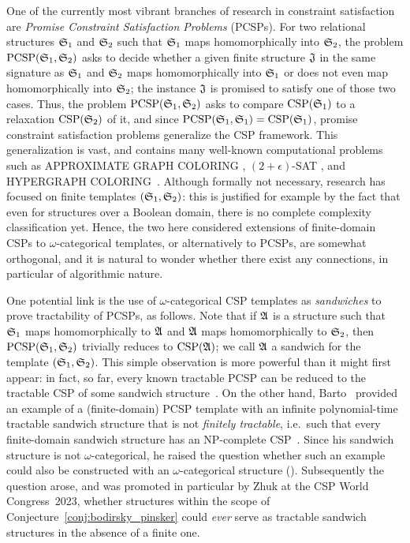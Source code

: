  One of the currently most vibrant branches of research in constraint satisfaction are \emph{Promise Constraint Satisfaction Problems} (PCSPs).
%
For two relational structures $\mathfrak{S}_1$ and $\mathfrak{S}_2$ such that $\mathfrak{S}_1$ maps homomorphically into $\mathfrak{S}_2$, the problem  $\mathrm{PCSP}(\mathfrak{S}_1,\mathfrak{S}_2)$ asks to decide whether a given finite  structure $\mathfrak{J}$ in the same signature as $\mathfrak{S}_1$ and $\mathfrak{S}_2$ maps homomorphically into $\mathfrak{S}_1$ or does not even map homomorphically into $\mathfrak{S}_2$; the instance $\mathfrak{J}$ is  promised to satisfy one of those two cases. Thus, the problem $\mathrm{PCSP}(\mathfrak{S}_1,\mathfrak{S}_2)$ asks to compare $\mathrm{CSP}(\mathfrak{S}_1)$ to a relaxation $\mathrm{CSP}(\mathfrak{S}_2)$ of it, and  
since $\mathrm{PCSP}(\mathfrak{S}_1,\mathfrak{S}_1)=\mathrm{CSP}(\mathfrak{S}_1)$, promise constraint satisfaction problems generalize the CSP framework. This generalization is vast, and contains many well-known computational problems such as  APPROXIMATE GRAPH COLORING \cite{approximatecolouring}, $(2+\epsilon)$-SAT \cite{2plusepsilonSAT}, and HYPERGRAPH COLORING~\cite{hypergraphcol}. 
%
%
Although formally not necessary,  research has focused on finite templates $(\mathfrak{S}_1,\mathfrak{S}_2)$: this is justified for example by the fact that even for structures over a Boolean domain, there is no complete complexity classification yet. 
%
Hence, the two here considered extensions of finite-domain CSPs to $\omega$-categorical templates, or alternatively to PCSPs, are somewhat orthogonal, and it is natural to wonder whether there exist any connections, in particular of algorithmic nature. 




 One potential link is the use of $\omega$-categorical CSP templates as \emph{sandwiches} to prove tractability of PCSPs, as follows. 
Note that if $\mathfrak{A}$ is a structure such that $\mathfrak{S}_1$ maps homomorphically to $\mathfrak{A}$ and $\mathfrak{A}$ maps homomorphically to $\mathfrak{S}_2$, then $\mathrm{PCSP}(\mathfrak{S}_1,\mathfrak{S}_2)$ trivially reduces to $\mathrm{CSP}(\mathfrak{A})$; we call $\mathfrak{A}$ a sandwich for the template $(\mathfrak{S}_1,\mathfrak{S}_2)$. 
%
This simple observation is more powerful than it might first appear: in fact, so far, every known tractable PCSP can be reduced to the tractable CSP of some sandwich structure~\cite{PromiseandInfDomCSPs,sandwichespromiseconstraintsatisfaction}. 
%
On the other hand, Barto~\cite{promisesmakefiniteproblemsinfinitary} provided an example of a (finite-domain) PCSP template with an infinite polynomial-time tractable sandwich structure that is not \emph{finitely  tractable}, i.e.~such that every finite-domain sandwich structure has an NP-complete CSP~\cite{promisesmakefiniteproblemsinfinitary}. Since his sandwich structure is not $\omega$-categorical, he raised the question whether such an example could also be constructed with an $\omega$-categorical structure (\cite[Question IV.1]{promisesmakefiniteproblemsinfinitary}). Subsequently the question arose, and was promoted in particular by Zhuk at the CSP World Congress~2023, whether structures within the scope of Conjecture~\ref{conj:bodirsky_pinsker} could \emph{ever} serve as tractable sandwich structures in the absence of a finite one. 

